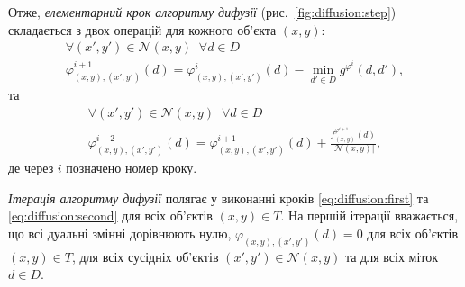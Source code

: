 Отже, \textit{елементарний крок алгоритму дифузії}
(рис.~\ref{fig:diffusion:step})
складається з двох операцій для кожного об'єкта $\left(x, y \right)$:
\begin{equation}\label{eq:diffusion:first}
\begin{gathered}
    \forall \left( x', y' \right) \in \mathcal{N} \left(x, y\right) \; \;
    \forall d \in D \\
    \varphi_{\left(x, y \right), \left(x', y' \right)}^{i + 1} \left( d \right)
    = \varphi_{\left(x, y \right), \left(x', y' \right)}^i \left( d \right)
    - \min \limits_{d' \in D}
        g^{\varphi^i} \left(d, d' \right),
\end{gathered}
\end{equation}
та
\begin{equation}\label{eq:diffusion:second}
\begin{gathered}
    \forall \left( x', y' \right) \in \mathcal{N} \left(x, y\right) \; \;
    \forall d \in D \\
    \varphi_{\left(x, y \right), \left(x', y' \right)}^{i + 2} \left( d \right)
    = \varphi_{\left(x, y \right), \left(x', y' \right)}^{i + 1} \left( d \right)
    + \frac{f_{\left(x, y \right)}^{\varphi^{i + 1}} \left(d \right)}{\left| \mathcal{N} \left(x, y \right)\right|},
\end{gathered}
\end{equation}
де через $i$ позначено номер кроку.

\textit{Ітерація алгоритму дифузії}
полягає у виконанні кроків \eqref{eq:diffusion:first}
та \eqref{eq:diffusion:second} для всіх об'єктів $\left( x, y \right) \in T$.
На першій ітерації вважається, що всі дуальні змінні дорівнюють нулю,
$\varphi_{\left(x, y \right), \left(x', y' \right)} \left( d \right) = 0$
для всіх об'єктів $\left(x, y \right) \in T$,
для всіх сусідніх об'єктів
$\left(x', y' \right) \in \mathcal{N} \left(x, y \right)$
та для всіх міток $d \in D$.

